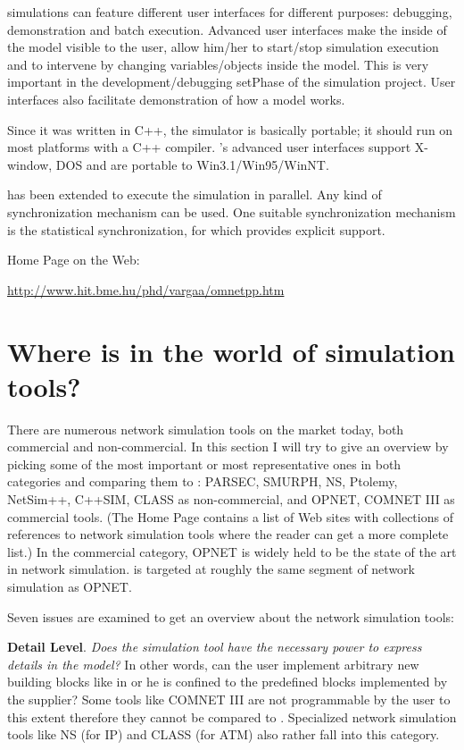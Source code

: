 {\opp} simulations can feature different user interfaces for 
different purposes: debugging, demonstration and batch execution. 
Advanced user interfaces make the inside of the model visible 
to the user, allow him/her to start/stop simulation execution 
and to intervene by changing variables/objects inside the model. 
This is very important in the development/debugging setPhase 
of the simulation project. User interfaces also facilitate demonstration 
of how a model works.

Since it was written in C++, the simulator is basically portable; 
it should run on most platforms with a C++ compiler. {\opp}'s 
advanced user interfaces support X-window, DOS and are portable 
to Win3.1/Win95/WinNT.

{\opp} has been extended to execute the simulation in parallel. 
Any kind of synchronization mechanism can be used. One suitable 
synchronization mechanism is the statistical synchronization, 
for which {\opp} provides explicit support.


{\opp} Home Page on the Web: 


\href{http://www.hit.bme.hu/phd/vargaa/omnetpp.htm}{http://www.hit.bme.hu/phd/vargaa/omnetpp.htm}





\section{Where is {\opp} in the world of simulation tools?}

There are numerous network simulation tools on the market today, 
both commercial and non-commercial. In this section I will try 
to give an overview by picking some of the most important or 
most representative ones in both categories and comparing them 
to {\opp}: PARSEC, SMURPH, NS, Ptolemy, NetSim++, C++SIM, CLASS 
as non-commercial, and OPNET, COMNET III as commercial tools. 
(The {\opp} Home Page contains a list of Web sites with collections 
of references to network simulation tools where the reader can 
get a more complete list.) In the commercial category, OPNET 
is widely held to be the state of the art in network simulation. 
{\opp} is targeted at roughly the same segment of network simulation 
as OPNET.{\nobreakspace}


Seven issues are examined to get an overview about the network 
simulation tools:


\textbf{Detail Level}. \textit{Does the simulation tool have the necessary 
power to express details in the model?} In other words, can the 
user implement arbitrary new building blocks like in {\opp} 
or he is confined to the predefined blocks implemented by the 
supplier? Some tools like COMNET III are not programmable by 
the user to this extent therefore they cannot be compared to 
{\opp}. Specialized network simulation tools like NS (for IP) 
and CLASS (for ATM) also rather fall into this category. 


